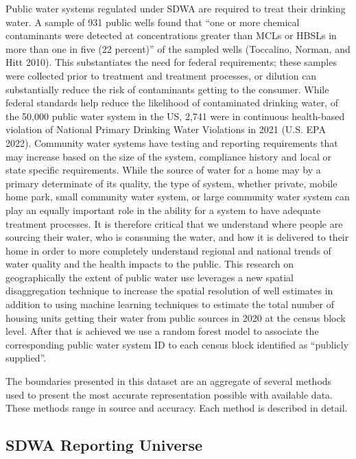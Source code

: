 \documentclass[
  letterpaper,
  DIV=11,
  numbers=noendperiod,
  oneside]{scrartcl}
\begin{document}
Public water systems regulated under SDWA are required to treat their
drinking water. A sample of 931 public wells found that ``one or more
chemical contaminants were detected at concentrations greater than MCLs
or HBSLs in more than one in five (22 percent)'' of the sampled wells
(Toccalino, Norman, and Hitt 2010). This substantiates the need for
federal requirements; these samples were collected prior to treatment
and treatment processes, or dilution can substantially reduce the risk
of contaminants getting to the consumer. While federal standards help
reduce the likelihood of contaminated drinking water, of the 50,000
public water system in the US, 2,741 were in continuous health-based
violation of National Primary Drinking Water Violations in 2021 (U.S.
EPA 2022). Community water systems have testing and reporting
requirements that may increase based on the size of the system,
compliance history and local or state specific requirements. While the
source of water for a home may by a primary determinate of its quality,
the type of system, whether private, mobile home park, small community
water system, or large community water system can play an equally
important role in the ability for a system to have adequate treatment
processes. It is therefore critical that we understand where people are
sourcing their water, who is consuming the water, and how it is
delivered to their home in order to more completely understand regional
and national trends of water quality and the health impacts to the
public. This research on geographically the extent of public water use
leverages a new spatial disaggregation technique to increase the spatial
resolution of well estimates in addition to using machine learning
techniques to estimate the total number of housing units getting their
water from public sources in 2020 at the census block level. After that
is achieved we use a random forest model to associate the corresponding
public water system ID to each census block identified as ``publicly
supplied''.

The boundaries presented in this dataset are an aggregate of several
methods used to present the most accurate representation possible with
available data. These methods range in source and accuracy. Each method
is described in detail.

\subsection{SDWA Reporting Universe}\label{sdwa-reporting-universe}
\end{document}
